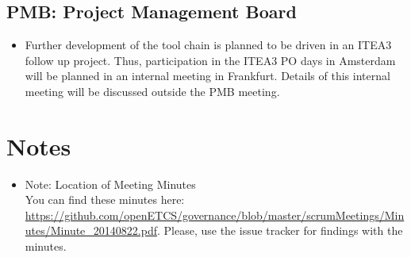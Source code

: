 \documentclass[a4paper, 11pt]{article}
\begin{document}
\subsection{PMB: Project Management Board}
\begin{itemize}
\item Further development of the tool chain is planned to be driven in an ITEA3 follow up project. Thus, participation in the ITEA3 PO days in Amsterdam will be planned in an internal meeting in Frankfurt. Details of this internal meeting will be discussed outside the PMB meeting.
\end{itemize}

\section{Notes}
\begin{itemize}

\item Note: Location of Meeting Minutes\\
You can find these minutes here: \url{https://github.com/openETCS/governance/blob/master/scrumMeetings/Minutes/Minute_20140822.pdf}. Please, use the issue tracker for findings with the minutes.

\end{itemize}
\end{document}
